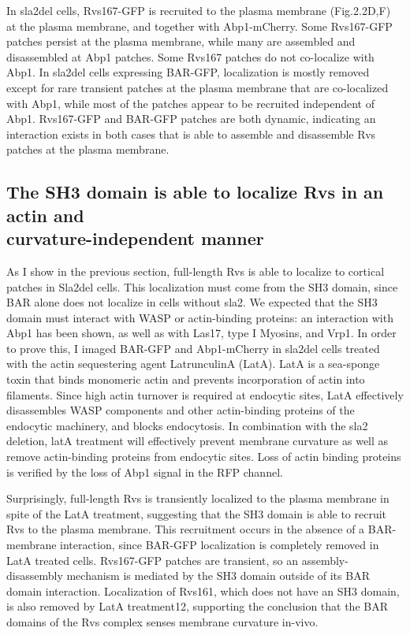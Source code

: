 	\vspace{5mm}
In sla2del cells, Rvs167-GFP is recruited to the plasma membrane (Fig.2.2D,F) at the plasma membrane, and together with Abp1-mCherry. Some Rvs167-GFP patches persist at the plasma membrane, while many are assembled and disassembled at Abp1 patches. Some Rvs167 patches do not co-localize with Abp1. In sla2del cells expressing BAR-GFP, localization is mostly removed except for rare transient patches at the plasma membrane that are co-localized with Abp1, while most of the patches appear to be recruited independent of Abp1. Rvs167-GFP and BAR-GFP patches are both dynamic, indicating an interaction exists in both cases that is able to assemble and disassemble Rvs patches at the plasma membrane. 

	\subsection{The SH3 domain is able to localize Rvs in an 
		actin and \\ curvature-independent manner}

	As I show in the previous section, full-length Rvs is able to localize to cortical patches in Sla2del cells. This localization must come from the SH3 domain, since BAR alone does not localize in cells without sla2. We expected that the SH3 domain must interact with WASP or actin-binding proteins: an interaction with Abp1 has been shown, as well as with Las17, type I Myosins, and Vrp1. In order to prove this, I imaged BAR-GFP and Abp1-mCherry in sla2del cells treated with the actin sequestering agent LatrunculinA (LatA). LatA is a sea-sponge toxin that binds monomeric actin and prevents incorporation of actin into filaments. Since high actin turnover is required at endocytic sites, LatA effectively disassembles WASP components and other actin-binding proteins of the endocytic machinery, and blocks endocytosis. In combination with the sla2 deletion, latA treatment will effectively prevent membrane curvature as well as remove actin-binding proteins from endocytic sites. Loss of actin binding proteins is verified by the loss of Abp1 signal in the RFP channel.


	\vspace{5mm}
Surprisingly, full-length Rvs is transiently localized to the plasma membrane in spite of the LatA treatment, suggesting that the SH3 domain is able to recruit Rvs to the plasma membrane. This recruitment occurs in the absence of a BAR-membrane interaction, since BAR-GFP localization is completely removed in LatA treated cells. Rvs167-GFP patches are transient, so an assembly-disassembly mechanism is mediated by the SH3 domain outside of its BAR domain interaction. Localization of Rvs161, which does not have an SH3 domain, is also removed by LatA treatment12, supporting the conclusion that the BAR domains of the Rvs complex senses membrane curvature in-vivo. 

